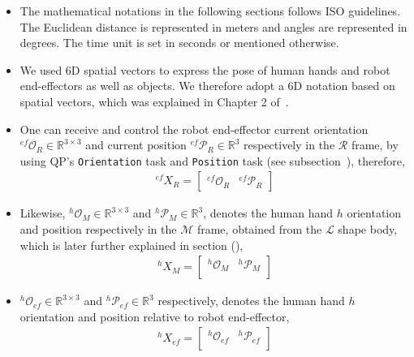 \begin{itemize}
	\item The mathematical notations in the following sections follows ISO guidelines. The Euclidean distance is represented in meters and angles are represented in degrees. The time unit is set in seconds or mentioned otherwise.
	
	\item We used 6D spatial vectors to express the pose of human hands and robot end-effectors as well as objects. We therefore adopt a 6D notation based on spatial vectors, which was explained in Chapter 2 of~\cite{featherstone2014rigid}.
	
	\item One can receive and control the robot end-effector current orientation ${{}^{ef}\mathcal{O}_R} \in \mathbb{R}^{3\times3}$ and current position ${{}^{ef}\mathcal{P}_R} \in \mathbb{R}^{3}$ respectively in the $\mathcal{R}$ frame, by using QP's \texttt{Orientation} task and \texttt{Position} task (see subsection~), therefore,
	\begin{gather}\label{X_R_ef}
	{}^{ef}{X}_R =
	\left[\begin{array}{cc}
	{}^{ef}\mathcal{O}_R & {}^{ef}\mathcal{P}_R
	\end{array}\right]
	\end{gather}
	
	\item Likewise, ${{}^{h}\mathcal{O}_M} \in \mathbb{R}^{3\times3}$ and ${{}^{h}\mathcal{P}_M} \in \mathbb{R}^{3}$, denotes the human hand $h$ orientation and position respectively in the $\mathcal{M}$ frame, obtained from the $\mathcal{L}$ shape body, which is later further explained in section (),
	\begin{gather}\label{X_M_h}
	{}^{h}{X}_M =
	\left[\begin{array}{cc}
	{}^{h}\mathcal{O}_M & {}^{h}\mathcal{P}_M \\
	\end{array}\right]
	\end{gather}
	
	\item ${{}^{h}\mathcal{O}_{ef}} \in \mathbb{R}^{3\times3}$ and ${{}^{h}\mathcal{P}_{ef}} \in \mathbb{R}^{3}$ respectively, denotes the human hand $h$ orientation and position relative to robot end-effector,
	\begin{gather}\label{X_ef_h}
	{}^{h}{X}_{ef} =
	\left[\begin{array}{cc}
	{}^{h}\mathcal{O}_{ef} & {}^{h}\mathcal{P}_{ef} \\
	\end{array}\right]
	\end{gather}
	

\end{itemize}
